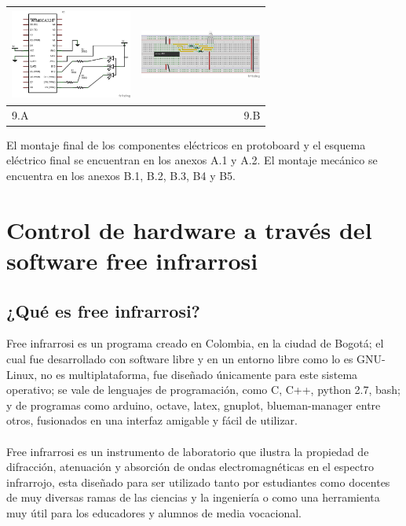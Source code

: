 \documentclass[12]{article}
\newenvironment{Figure}
{\par\medskip\noindent\minipage{\linewidth}}
{\endminipage\par\medskip}
\begin{document}
\begin{multicols}{2}
\begin{Figure}	
\center
\begin{tabular}{|l|r|}
\hline
\includegraphics[width=4cm, height=3cm]{img/rgbesq.png} & \includegraphics[width=4cm, height=3cm]{img/rgbmont.png} \\ \hline
9.A & 9.B \\ \hline
\end{tabular}
\label{fig:g9}
\end{Figure}
\vspace{0.6 cm}

El montaje final de los componentes eléctricos en protoboard y el esquema eléctrico final se encuentran en los anexos A.1 y A.2.
El montaje mecánico se encuentra en los anexos B.1, B.2,  B.3, B4 y B5.

\section{Control de hardware a través del software free infrarrosi}

\subsection{¿Qué es free infrarrosi?}
Free infrarrosi es un  programa creado en Colombia, en la ciudad de Bogotá; el cual fue desarrollado con software libre y en un entorno libre como lo es GNU-Linux, no es multiplataforma, fue diseñado únicamente para este sistema operativo; se vale de lenguajes de programación, como  C, C++, python 2.7, bash; y de programas como arduino, octave, latex, gnuplot, blueman-manager entre otros, fusionados en una interfaz amigable y fácil de utilizar. \\\\
Free infrarrosi es un instrumento de laboratorio que ilustra  la propiedad de difracción, atenuación y absorción de ondas electromagnéticas en el espectro infrarrojo, esta diseñado para ser utilizado tanto por  estudiantes como docentes de muy diversas ramas de las ciencias y  la ingeniería o como una herramienta muy útil para los educadores y alumnos de media vocacional.


\end{multicols}
\end{document}
